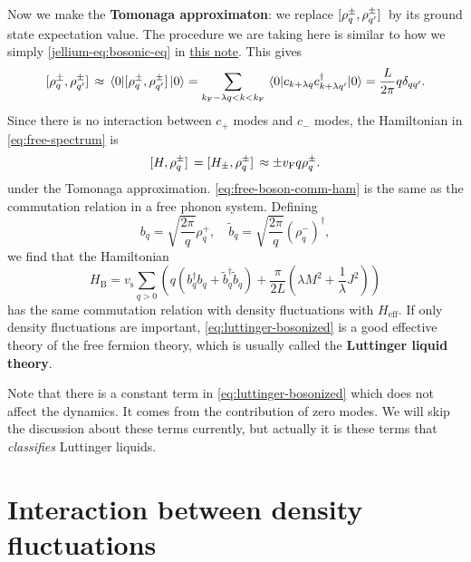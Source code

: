 \documentclass[hyperref, a4paper]{article}
\newcommand*{\concept}[1]{{\textbf{#1}}}
\newcommand{\jellium}{\href{../band-metal-insulator/electron-gas.pdf}{this note}}
\begin{document}
Now we make the \concept{Tomonaga approximaton}: we replace $\comm*{\rho^\pm_q}{\rho^\pm_{q'}}$ by its ground state 
expectation value. The procedure we are taking here is similar to how we simply \eqref{jellium-eq:bosonic-eq} in \jellium. %
This gives 
\begin{equation}
    \comm*{\rho^\pm_q}{\rho^\pm_{q'}} \approx \expval*{\comm*{\rho^\pm_q}{\rho^\pm_{q'}}}{0} = \sum_{k_\text{F} - \lambda q < k < k_\text{F}} \expval*{c_{k+\lambda q} c^\dagger_{k + \lambda q'}}{0} = \frac{L}{2\pi} q \delta_{qq'}.
\end{equation}
Since there is no interaction between $c_+$ modes and $c_-$ modes, the Hamiltonian in \eqref{eq:free-spectrum} is  
\begin{equation}
    \comm*{H}{\rho_q^\pm} = \comm*{H_\pm}{\rho_q^\pm} \approx \pm v_\text{F} q \rho^\pm_q.
    \label{eq:free-boson-comm-ham}
\end{equation}
under the Tomonaga approximation. \eqref{eq:free-boson-comm-ham} is the same as the commutation relation in a free phonon system.
Defining 
\begin{equation}
    b_{q} = \sqrt{\frac{2\pi}{q}} \rho^+_q, \quad \tilde{b}_q = \sqrt{\frac{2\pi}{q}} (\rho_q^-)^\dagger,
\end{equation}
we find that the Hamiltonian
\begin{equation}
    H_\text{B} = v_\text{s} \sum_{q > 0} \left( q(b^\dagger_q b_q + \tilde{b}^\dagger_q \tilde{b}_q) + \frac{\pi}{2L} (\lambda M^2 + \frac{1}{\lambda} J^2) \right)
    \label{eq:luttinger-bosonized}
\end{equation}
has the same commutation relation with density fluctuations with $H_\text{eff}$. 
If only density fluctuations are important, \eqref{eq:luttinger-bosonized} is a good effective theory of the free fermion theory, which is usually called the \concept{Luttinger liquid theory}.

Note that there is a constant term in \eqref{eq:luttinger-bosonized} which does not affect the dynamics. 
It comes from the contribution of zero modes.
We will skip the discussion about these terms currently, but actually it is these terms that \emph{classifies} Luttinger liquids.

\section{Interaction between density fluctuations}
\end{document}
